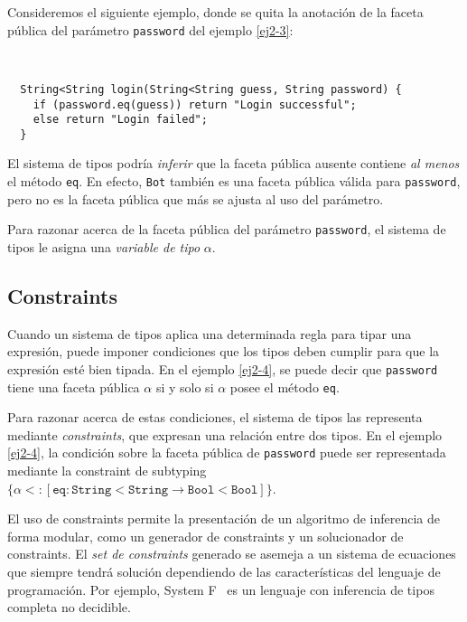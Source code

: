 Consideremos el siguiente ejemplo, donde se quita la anotación de la faceta pública del parámetro \texttt{password} del ejemplo \ref{ej2-3}:

\begin{ej} \ \\
  \normalfont
  \label{ej2-4}
\begin{lstlisting}
  String<String login(String<String guess, String password) {
  	if (password.eq(guess)) return "Login successful";
  	else return "Login failed";
  }
\end{lstlisting}
\end{ej}

El sistema de tipos podría \emph{inferir} que la faceta pública ausente contiene \emph{al menos} el método \texttt{eq}. En efecto, \texttt{Bot} también es una faceta pública válida para \texttt{password}, pero no es la faceta pública que más se ajusta al uso del parámetro.

Para razonar acerca de la faceta pública del parámetro \texttt{password}, el sistema de tipos le asigna una \emph{variable de tipo} $\alpha$.

\subsection{Constraints} \label{constraints}
Cuando un sistema de tipos aplica una determinada regla para tipar una expresión, puede imponer condiciones que los tipos deben cumplir para que la expresión esté bien tipada. En el ejemplo \ref{ej2-4}, se puede decir que \texttt{password} tiene una faceta pública $\mathtt{\alpha}$ si y solo si $\mathtt{\alpha}$ posee el método \texttt{eq}.

Para razonar acerca de estas condiciones, el sistema de tipos las representa mediante \emph{constraints}, que expresan una relación entre dos tipos. En el ejemplo \ref{ej2-4}, la condición sobre la faceta pública de \texttt{password} puede ser representada mediante la constraint de subtyping $\{\alpha <: [\mathtt{eq} : \mathtt{String<String} \rightarrow \mathtt{Bool<Bool}]\}$.

El uso de constraints permite la presentación de un algoritmo de inferencia de forma modular, como un generador de constraints y un solucionador de constraints. El \emph{set de constraints} generado se asemeja a un sistema de ecuaciones que siempre tendrá solución dependiendo de las características del lenguaje de programación. Por ejemplo, System F~\cite{WELLS1999111} es un lenguaje con inferencia de tipos completa no decidible.

